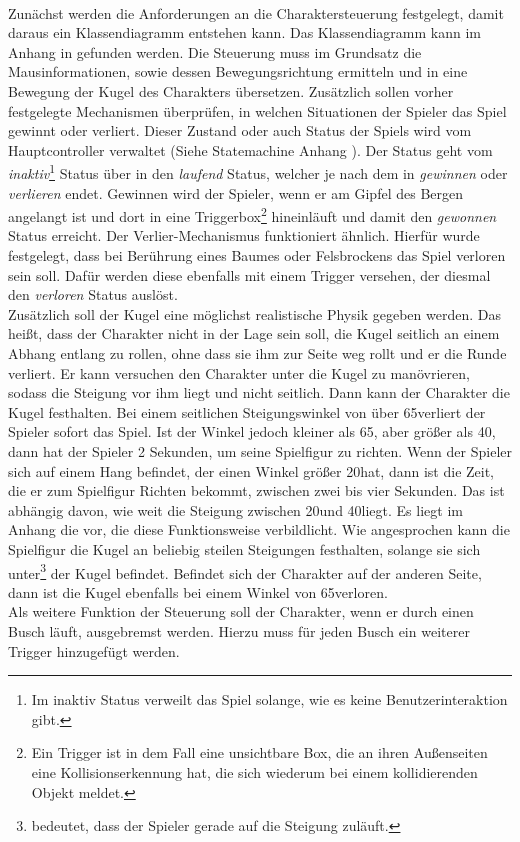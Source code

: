 \paragraph{}
Zunächst werden die Anforderungen an die Charaktersteuerung festgelegt, damit daraus ein Klassendiagramm entstehen kann. Das Klassendiagramm kann im Anhang in  gefunden werden. Die Steuerung muss im Grundsatz die Mausinformationen, sowie dessen Bewegungsrichtung ermitteln und in eine Bewegung der Kugel des Charakters übersetzen. Zusätzlich sollen vorher festgelegte Mechanismen überprüfen, in welchen Situationen der Spieler das Spiel gewinnt oder verliert. Dieser Zustand oder auch Status der Spiels wird vom Hauptcontroller verwaltet (Siehe Statemachine Anhang ). Der Status geht vom \textit{inaktiv}\footnote{Im inaktiv Status verweilt das Spiel solange, wie es keine Benutzerinteraktion gibt.} Status über in den \textit{laufend} Status, welcher je nach dem in \textit{gewinnen} oder \textit{verlieren} endet. Gewinnen wird der Spieler, wenn er am Gipfel des Bergen angelangt ist und dort in eine Triggerbox\footnote{Ein Trigger ist in dem Fall eine unsichtbare Box, die an ihren Außenseiten eine Kollisionserkennung hat, die sich wiederum bei einem kollidierenden Objekt meldet.} hineinläuft und damit den \textit{gewonnen} Status erreicht. Der Verlier-Mechanismus funktioniert ähnlich. Hierfür wurde festgelegt, dass bei Berührung eines Baumes oder Felsbrockens das Spiel verloren sein soll. Dafür werden diese ebenfalls mit einem Trigger versehen, der diesmal den \textit{verloren} Status auslöst. \\
Zusätzlich soll der Kugel eine möglichst realistische Physik gegeben werden. Das heißt, dass der Charakter nicht in der Lage sein soll, die Kugel seitlich an einem Abhang entlang zu rollen, ohne dass sie ihm zur Seite weg rollt und er die Runde verliert. Er kann versuchen den Charakter unter die Kugel zu manövrieren, sodass die Steigung vor ihm liegt und nicht seitlich. Dann kann der Charakter die Kugel festhalten. Bei einem seitlichen Steigungswinkel von über 65\cc verliert der Spieler sofort das Spiel. Ist der Winkel jedoch kleiner als 65\cc, aber größer als 40\cc, dann hat der Spieler 2 Sekunden, um seine Spielfigur zu richten. Wenn der Spieler sich auf einem Hang befindet, der einen Winkel größer 20\cc hat, dann ist die Zeit, die er zum Spielfigur Richten bekommt, zwischen zwei bis vier Sekunden. Das ist abhängig davon, wie weit die Steigung zwischen 20\cc und 40\cc liegt. Es liegt im Anhang die  vor, die diese Funktionsweise verbildlicht. Wie angesprochen kann die Spielfigur die Kugel an beliebig steilen Steigungen festhalten, solange sie sich unter\footnote{ bedeutet, dass der Spieler gerade auf die Steigung zuläuft.} der Kugel befindet. Befindet sich der Charakter auf der anderen Seite, dann ist die Kugel ebenfalls bei einem Winkel von 65\cc verloren.\\
Als weitere Funktion der Steuerung soll der Charakter, wenn er durch einen Busch läuft, ausgebremst werden. Hierzu muss für jeden Busch ein weiterer Trigger hinzugefügt werden.

